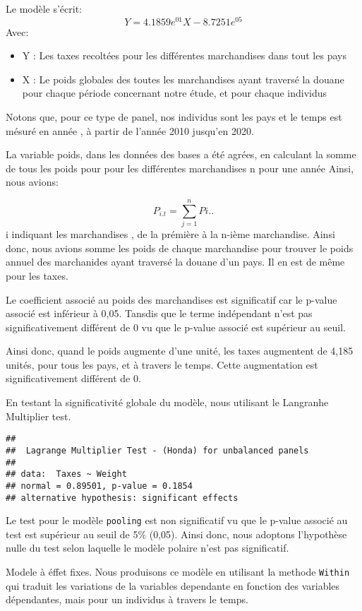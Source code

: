 \documentclass[
]{book}
\providecommand{\tightlist}{%
  \setlength{\itemsep}{0pt}\setlength{\parskip}{0pt}}
\begin{document}
Le modèle s'écrit:
\[Y= 4.1859e^{01} X - 8.7251e^{05}  \]
Avec:

\begin{itemize}
\tightlist
\item
  Y : Les taxes recoltées pour les différentes marchandises dans tout les pays
\item
  X : Le poids globales des toutes les marchandises ayant traversé la douane pour chaque période concernant notre étude, et pour chaque individus
\end{itemize}

Notons que, pour ce type de panel, nos individus sont les pays et le temps est mésuré en année , à partir de l'année 2010 jusqu'en 2020.

La variable poids, dans les données des bases a été agrées, en calculant la somme de tous les poids pour pour les différentes marchandises n pour une année
Ainsi, nous avions:

\[ P_{i.t}=\sum_{j=1}^{n} P{i..} \]
i indiquant les marchandises , de la prémière à la n-ième marchandise. Ainsi donc, nous avions somme les poids de chaque marchandise pour trouver le poids annuel des marchanides ayant traversé la douane d'un pays. Il en est de même pour les taxes.

Le coefficient associé au poids des marchandises est significatif car le p-value associé est inférieur à 0,05. Tansdis que le terme indépendant n'est pas significativement différent de 0 vu que le p-value associé est supérieur au seuil.

Ainsi donc, quand le poids augmente d'une unité, les taxes augmentent de 4,185 unités, pour tous les pays, et à travers le temps. Cette augmentation est significativement différent de 0.

En testant la significativité globale du modèle, nous utilisant le Langranhe Multiplier test.

\begin{verbatim}
## 
##  Lagrange Multiplier Test - (Honda) for unbalanced panels
## 
## data:  Taxes ~ Weight
## normal = 0.89501, p-value = 0.1854
## alternative hypothesis: significant effects
\end{verbatim}

Le test pour le modèle \texttt{pooling} est non significatif vu que le p-value associé au test est supérieur au seuil de 5\% (0,05). Ainsi donc, nous adoptons l'hypothèse nulle du test selon laquelle le modèle polaire n'est pas significatif.

Modele à éffet fixes.
Nous produisons ce modèle en utilisant la methode \texttt{Within} qui traduit les variations de la variables dependante en fonction des variables dépendantes, mais pour un individus à travers le temps.
\end{document}
